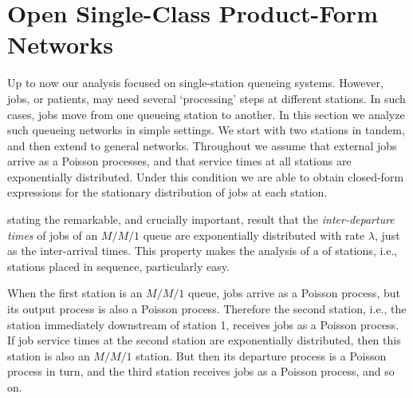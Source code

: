 


\section{Open Single-Class Product-Form Networks}
\label{sec:jackson-networks}


Up to now our analysis focused on single-station queueing systems.
However, jobs, or patients, may need several `processing' steps at different stations.
In such cases, jobs move from one queueing station to another.
In this section we analyze such queueing networks in simple settings.
We start with two stations in tandem, and then extend to general networks.
Throughout we assume that external jobs
arrive as a Poisson processes, and that service times at all stations are exponentially distributed.
Under this condition we are able to obtain closed-form expressions for the stationary distribution of jobs at each station.




 stating the remarkable, and crucially important, result that the \emph{inter-departure times} of jobs of an $M/M/1$ queue are exponentially distributed with rate $\lambda$, just as the inter-arrival times. This property makes the analysis of a  of stations, i.e., stations placed in sequence, particularly easy.

When the first station is an $M/M/1$ queue, jobs arrive as a Poisson process, but its output process is also a Poisson process.
Therefore the second station, i.e., the station immediately downstream of station 1, receives jobs as a Poisson process.
If job service times at the second station are exponentially distributed, then this station is also an $M/M/1$ station.
But then its departure process is a Poisson process in turn, and the third station receives jobs as a Poisson process, and so on.


